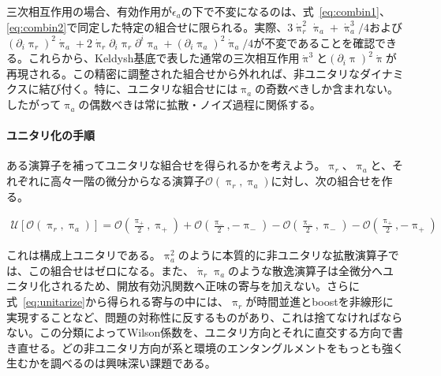 \documentclass[a4paper,11pt]{ltjsarticle}
\numberwithin{equation}{section}
\newcommand{\Eq}[1]{Eq.~(\ref{#1})}
\newcommand{\Eqs}[1]{Eqs.~(\ref{#1})}
\renewcommand{\Eq}[1]{式~\eqref{#1}}
\renewcommand{\Eqs}[1]{式~\eqref{#1}}
\begin{document}
三次相互作用の場合、有効作用が$\epsilon_a$の下で不変になるのは、\Eqs{eq:combin1}、\eqref{eq:combin2}で同定した特定の組合せに限られる。実際、$3\dot{\uppi}_r^2\dot{\uppi}_a+\dot{\uppi}_a^3/4$および$(\partial_i\uppi_r)^2\dot{\uppi}_a+2\dot{\uppi}_r\partial_i\uppi_r\partial^i\uppi_a+(\partial_i\uppi_a)^2\dot{\uppi}_a/4$が不変であることを確認できる。これらから、Keldysh基底で表した通常の三次相互作用$\dot{\uppi}^3$と$(\partial_i\uppi)^2\dot{\uppi}$が再現される。この精密に調整された組合せから外れれば、非ユニタリなダイナミクスに結び付く。特に、ユニタリな組合せには$\uppi_a$の奇数べきしか含まれない。したがって$\uppi_a$の偶数べきは常に拡散・ノイズ過程に関係する\cite{Hongo:2018ant}。

\paragraph{ユニタリ化の手順}

ある演算子を補ってユニタリな組合せを得られるかを考えよう。$\uppi_r$、$\uppi_a$と、それぞれに高々一階の微分からなる演算子$\mathcal{O}(\uppi_r,\uppi_a)$に対し、次の組合せを作る。

\begin{align}\label{eq:unitarize}
\mathcal{U}\left[\mathcal{O}\left(\uppi_r,\uppi_a\right)\right] = \mathcal{O}\left(\frac{\uppi_+}{2},\uppi_+\right) + \mathcal{O}(\frac{\uppi_-}{2},-\uppi_-) - \mathcal{O}\left(\frac{\uppi_-}{2},\uppi_-\right) - \mathcal{O}(\frac{\uppi_+}{2},-\uppi_+)
\end{align}

これは構成上ユニタリである。$\uppi_a^2$のように本質的に非ユニタリな拡散演算子では、この組合せはゼロになる。また、$\dot{\uppi}_r\uppi_a$のような散逸演算子は全微分へユニタリ化されるため、開放有効汎関数へ正味の寄与を加えない。さらに\Eq{eq:unitarize}から得られる寄与の中には、$\uppi_r$が時間並進とboostを非線形に実現することなど、問題の対称性に反するものがあり、これは捨てなければならない。この分類によってWilson係数を、ユニタリ方向とそれに直交する方向で書き直せる。どの非ユニタリ方向が系と環境のエンタングルメントをもっとも強く生むかを調べるのは興味深い課題である。
\end{document}
